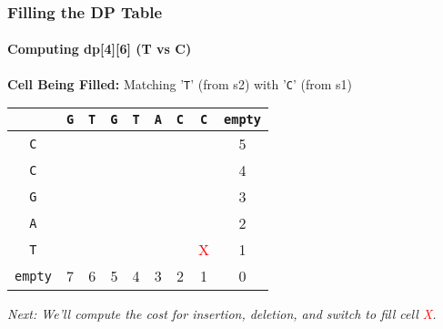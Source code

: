 \documentclass[10pt,aspectratio=43]{beamer}
\begin{document}
\begin{frame}
\frametitle{Filling the DP Table}
\framesubtitle{Computing dp[4][6] (T vs C)}

\textbf{Cell Being Filled:} Matching '\texttt{T}' (from s2) with '\texttt{C}' (from s1)

\vspace{0.3cm}

\begin{center}
\scriptsize
\begin{tabular}{|c|c|c|c|c|c|c|c|c|}
    \hline
    & \texttt{G} & \texttt{T} & \texttt{G} & \texttt{T} & \texttt{A} & \texttt{C} & \texttt{C} & \texttt{empty} \\ \hline
    \texttt{C} &  &  &  &  &  &  &  & 5 \\ \hline
    \texttt{C} &  &  &  &  &  &  &  & 4 \\ \hline
    \texttt{G} &  &  &  &  &  &  &  & 3 \\ \hline
    \texttt{A} &  &  &  &  &  &  &  & 2 \\ \hline
    \texttt{T} &  &  &  &  &  &  & \textcolor{red}{X} & 1 \\ \hline
    \texttt{empty} & 7 & 6 & 5 & 4 & 3 & 2 & 1 & 0 \\ \hline
\end{tabular}
\end{center}

\vspace{0.3cm}
\begin{center}
\textit{Next: We'll compute the cost for insertion, deletion, and switch to fill cell \textcolor{red}{X}.}
\end{center}
\end{frame}
\end{document}
